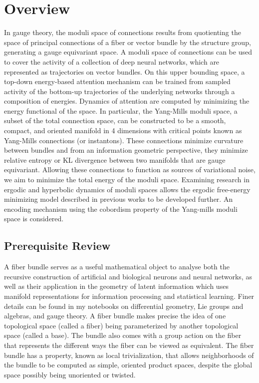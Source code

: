 \documentclass{article}
\begin{document}
\section{Overview}
In gauge theory, the moduli space of connections results from quotienting the space of principal connections of a fiber or vector bundle by the structure group, generating a gauge equivariant space. A moduli space of connections can be used to cover the activity of a collection of deep neural networks, which are represented as trajectories on vector bundles. On this upper bounding space, a top-down energy-based attention mechanism can be trained from sampled activity of the bottom-up trajectories of the underlying networks through a composition of energies. Dynamics of attention are computed by minimizing the energy functional of the space. In particular, the Yang-Mills moduli space, a subset of the total connection space, can be constructed to be a smooth, compact, and oriented manifold in 4 dimensions with critical points known as Yang-Mills connections (or instantons). These connections minimize curvature between bundles and from an information geometric perspective, they minimize relative entropy or KL divergence between two manifolds that are gauge equivariant. Allowing these connections to function as sources of variational noise, we aim to minimize the total energy of the moduli space. 
Examining research in ergodic and hyperbolic dynamics of moduli spaces allows the ergodic free-energy minimizing model described in previous works to be developed further.
An encoding mechanism using the cobordism property of the Yang-mills moduli space is considered.


\subsection{Prerequisite Review}
    A fiber bundle serves as a useful mathematical object to analyse both the recursive construction of artificial and biological neurons and neural networks, as well as their application in the geometry of latent information which uses manifold representations  for information processing and statistical learning.
    Finer details can be found in my notebooks on differential geometry, Lie groups and algebras, and gauge theory. A fiber bundle makes precise the idea of one topological space (called a fiber) being parameterized by another topological space (called a base). The bundle also comes with a group action on the fiber that represents the different ways the fiber can be viewed as equivalent. The fiber bundle has a property, known as local trivialization, that allows neighborhoods of the bundle to be computed as simple, oriented product spaces, despite the global space possibly being unoriented or twisted.
    
\end{document}
